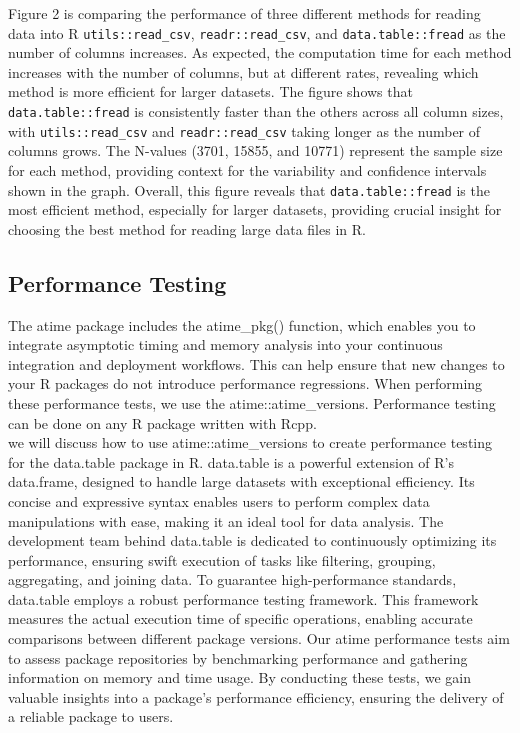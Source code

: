 \noindent Figure 2 is comparing the performance of three different methods for reading data into R \texttt{utils::read\_csv}, \texttt{readr::read\_csv}, and \texttt{data.table::fread} as the number of columns increases. As expected, the computation time for each method increases with the number of columns, but at different rates, revealing which method is more efficient for larger datasets. The figure shows that \texttt{data.table::fread} is consistently faster than the others across all column sizes, with \texttt{utils::read\_csv} and \texttt{readr::read\_csv} taking longer as the number of columns grows. The N-values (3701, 15855, and 10771) represent the sample size for each method, providing context for the variability and confidence intervals shown in the graph. Overall, this figure reveals that \texttt{data.table::fread} is the most efficient method, especially for larger datasets, providing crucial insight for choosing the best method for reading large data files in R.\\


\subsection{Performance Testing}
The atime package includes the atime\_pkg() function, which enables you to integrate asymptotic timing and memory analysis into your continuous integration and deployment workflows. 
This can help ensure that new changes to your R packages do not introduce performance regressions. When performing these performance tests, we use the atime::atime\_versions.
Performance testing can be done on any R package written with Rcpp.\\


\noindent we will discuss how to use atime::atime\_versions to create performance testing for the data.table package in R.
data.table is a powerful extension of R's data.frame, designed to handle large datasets with exceptional efficiency. Its concise and expressive syntax enables users to perform complex data manipulations with ease, making it an ideal tool for data analysis. The development team behind data.table is dedicated to continuously optimizing its performance, ensuring swift execution of tasks like filtering, grouping, aggregating, and joining data.
\vspace{0.1in}
To guarantee high-performance standards, data.table employs a robust performance testing framework. This framework measures the actual execution time of specific operations, enabling accurate comparisons between different package versions. 
Our atime performance tests aim to assess package repositories by benchmarking performance and gathering information on memory and time usage. 
\vspace{0.1in}
By conducting these tests, we gain valuable insights into a package's performance efficiency, ensuring the delivery of a reliable package to users.
\vspace{0.1in}

